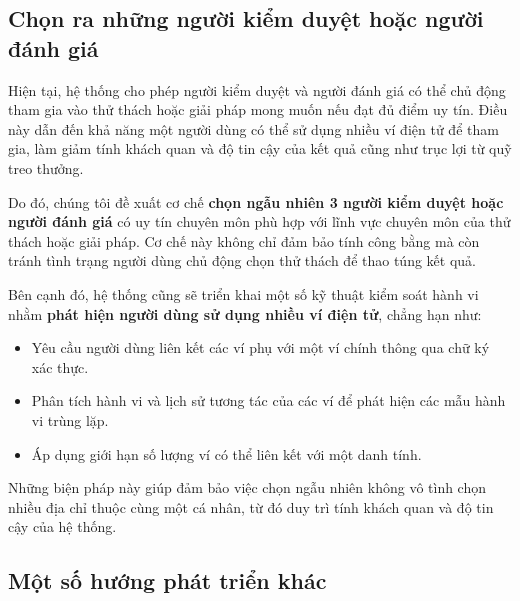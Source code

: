 \subsection{Chọn ra những người kiểm duyệt hoặc người đánh giá}

Hiện tại, hệ thống cho phép người kiểm duyệt và người đánh giá có thể chủ động tham gia vào thử thách hoặc giải pháp mong muốn nếu đạt đủ điểm uy tín. 
Điều này dẫn đến khả năng một người dùng có thể sử dụng nhiều ví điện tử để tham gia, làm giảm tính khách quan và độ tin cậy của kết quả cũng như trục lợi từ quỹ treo thưởng.

Do đó, chúng tôi đề xuất cơ chế \textbf{chọn ngẫu nhiên 3 người kiểm duyệt hoặc người đánh giá} có uy tín chuyên môn phù hợp với lĩnh vực chuyên môn của thử thách hoặc giải pháp. 
Cơ chế này không chỉ đảm bảo tính công bằng mà còn tránh tình trạng người dùng chủ động chọn thử thách để thao túng kết quả.

Bên cạnh đó, hệ thống cũng sẽ triển khai một số kỹ thuật kiểm soát hành vi nhằm \textbf{phát hiện người dùng sử dụng nhiều ví điện tử}, chẳng hạn như:
\begin{itemize}
  \item Yêu cầu người dùng liên kết các ví phụ với một ví chính thông qua chữ ký xác thực.
  \item Phân tích hành vi và lịch sử tương tác của các ví để phát hiện các mẫu hành vi trùng lặp.
  \item Áp dụng giới hạn số lượng ví có thể liên kết với một danh tính.
\end{itemize}

Những biện pháp này giúp đảm bảo việc chọn ngẫu nhiên không vô tình chọn nhiều địa chỉ thuộc cùng một cá nhân, từ đó duy trì tính khách quan và độ tin cậy của hệ thống.

\subsection{Một số hướng phát triển khác}


